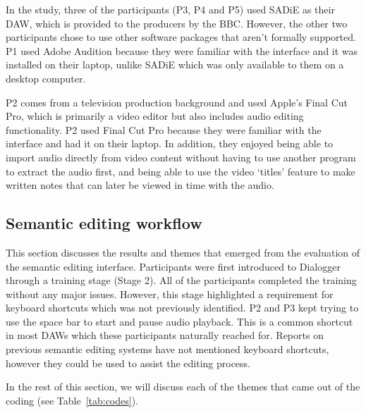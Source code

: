 In the study, three of the participants (P3, P4 and P5) used SADiE as their DAW, which is provided to the producers by
the BBC. However, the other two participants chose to use other software packages that aren't formally supported. P1
used Adobe Audition because they were familiar with the interface and it was installed on their laptop, unlike SADiE
which was only available to them on a desktop computer.

P2 comes from a television production background and used Apple's Final Cut Pro, which is primarily a video editor but
also includes audio editing functionality.  P2 used Final Cut Pro because they were familiar with the interface and had
it on their laptop. In addition, they enjoyed being able to import audio directly from video content without having to
use another program to extract the audio first, and being able to use the video `titles' feature to make written notes
that can later be viewed in time with the audio.

\subsection{Semantic editing workflow}\label{sec:resultsnew}
This section discusses the results and themes that emerged from the evaluation of the semantic editing interface.
Participants were first introduced to Dialogger through a training stage (Stage 2). All of the
participants completed the training without any major issues. However, this stage highlighted a requirement for
keyboard shortcuts which was not previously identified.  P2 and P3 kept trying to use the space bar to start and pause
audio playback. This is a common shortcut in most DAWs which these participants naturally reached for. Reports on
previous semantic editing systems have not mentioned keyboard shortcuts, however they could be used to assist the
editing process.

In the rest of this section, we will discuss each of the themes that came out of the coding (see Table~\ref{tab:codes}).




